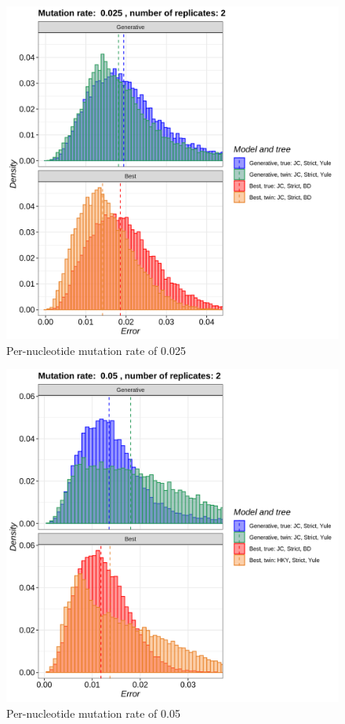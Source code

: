 \begin{figure}[H]
  \includegraphics[width=\textwidth]{pirouette_example_24/errors_2.png}
  \caption{Per-nucleotide mutation rate of 0.025}
\end{figure}

\begin{figure}[H]
  \includegraphics[width=\textwidth]{pirouette_example_24/errors_3.png}
  \caption{Per-nucleotide mutation rate of 0.05}
\end{figure}

